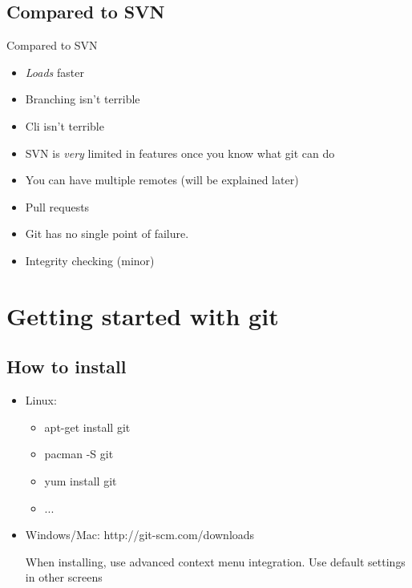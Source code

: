 \documentclass[10pt,a4paper]{beamer}
\begin{document}
\subsection{Compared to SVN}
\begin{frame}{Compared to SVN}
\begin{itemize}
\item \textit{Loads} faster
\item Branching isn't terrible
\item Cli isn't terrible
\item SVN is \textit{very} limited in features once you know what git can do
\item You can have multiple remotes (will be explained later)
\item Pull requests
\item Git has no single point of failure.
\item Integrity checking (minor)

\end{itemize}
\end{frame}


\section{Getting started with git}


\subsection{How to install}
\begin{frame}
\begin{itemize}
\item Linux:
\begin{itemize}
\item apt-get install git
\item pacman -S git
\item yum install git
\item ...
\end{itemize}
\item Windows/Mac: http://git-scm.com/downloads

When installing, use advanced context menu integration. Use default settings in other screens
\end{itemize}
\end{frame}
\end{document}
